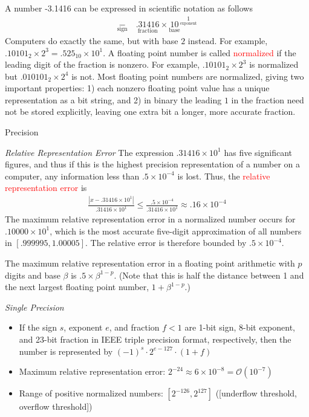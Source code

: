 \documentclass{ximera}
\begin{document}
A number -3.1416 can be expressed in scientific notation as follows
\begin{align}
    \underset{\text{sign}}{-} \quad \underset{\text{fraction}}{.31416} \times \underset{\text{base}}{10}^{\underset{\text{exponent}}{1}}
\end{align}
Computers do exactly the same, but with base $2$ instead.  For example, $.10101_2\times 2^3 = .525_{10}\times 10^1$.  A floating point number is called \textcolor{red}{normalized} if the leading digit of the fraction is nonzero.  For example, $.10101_2\times 2^3$ is normalized but $.010101_2\times 2^4$ is not.  Most floating point numbers are normalized, giving two important properties: 1) each nonzero floating point value has a unique representation as a bit string, and 2) in binary the leading $1$ in the fraction need not be stored explicitly, leaving one extra bit a longer, more accurate fraction.

Precision 

\textit{Relative Representation Error}
    The expression $.31416\times 10^1$ has five significant figures, and thus if this is the highest precision representation of a number on a computer, any information less than $.5\times 10^{-4}$ is lost.  Thus, the \textcolor{red}{relative representation error} is
    \begin{align}
        \frac{|x-.31416\times 10^1|}{.31416\times 10^1} \leq \frac{.5\times 10^{-4}}{.31416\times 10^1} \approx .16 \times 10^{-4}
    \end{align}
    The maximum relative representation error in a normalized number occurs for $.10000\times 10^1$, which is the most accurate five-digit approximation of all numbers in $[.999995, 1.00005]$.  The relative error is therefore bounded by $.5\times 10^{-4}$.  
    \begin{definition}
        The maximum relative representation error in a floating point arithmetic with $p$ digits and base $\beta$ is $.5\times \beta^{1-p}$. (Note that this is half the distance between 1 and the next largest floating point number, $1+\beta^{1-p}$.)
    \end{definition}

\textit{Single Precision}
\begin{itemize}
    \item If the sign $s$, exponent $e$, and fraction $f<1$ are 1-bit sign, 8-bit exponent, and 23-bit fraction in IEEE triple precision format, respectively, then the number is represented by $(-1)^s \cdot 2^{e-127}\cdot(1+f)$
    \item Maximum relative representation error: $2^{-24} \approx 6\times 10^{-8} = \mathcal{O}(10^{-7})$
    \item Range of positive normalized numbers: $[2^{-126}, 2^{127}]$ ([underflow threshold, overflow threshold])
\end{itemize}
\end{document}
